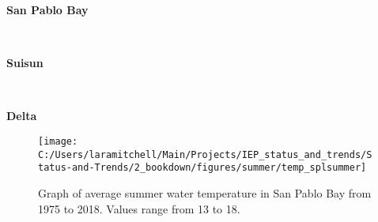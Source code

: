 \documentclass[
]{book}
\begin{document}
\begin{panel-grid}

\begin{columns-nocenter}

\begin{column800}

\textbf{San Pablo Bay}

\end{column800}

\begin{column40}

~

\end{column40}

\begin{column800}

\textbf{Suisun}

\end{column800}

\begin{column40}

~

\end{column40}

\begin{column800}

\textbf{Delta}

\end{column800}

\end{columns-nocenter}

\begin{columns-nocenter}

\begin{column800}

\begin{expand}

\begin{figure}
\texttt{[image: C:/Users/laramitchell/Main/Projects/IEP\_status\_and\_trends/Status-and-Trends/2\_bookdown/figures/summer/temp\_splsummer]} \caption{Graph of average summer water temperature in San Pablo Bay from 1975 to 2018. Values range from 13 to 18.}\label{fig:unnamed-chunk-57}
\end{figure}

\end{expand}

\end{column800}

\begin{column40}

~


\end{column40}
\end{columns-nocenter}
\end{panel-grid}
\end{document}
